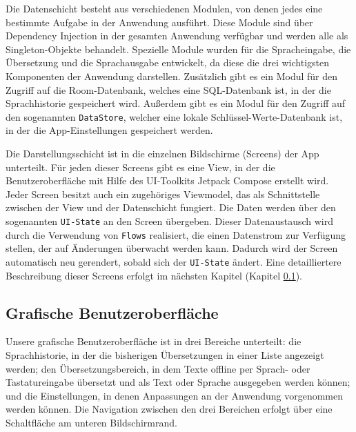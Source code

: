 Die Datenschicht besteht aus verschiedenen Modulen, von denen jedes eine bestimmte Aufgabe in der Anwendung ausführt. Diese Module sind über Dependency Injection in der gesamten Anwendung verfügbar und werden alle als Singleton-Objekte behandelt. Spezielle Module wurden für die Spracheingabe, die Übersetzung und die Sprachausgabe entwickelt, da diese die drei wichtigsten Komponenten der Anwendung darstellen. Zusätzlich gibt es ein Modul für den Zugriff auf die Room-Datenbank, welches eine SQL-Datenbank ist, in der die Sprachhistorie gespeichert wird. Außerdem gibt es ein Modul für den Zugriff auf den sogenannten \texttt{DataStore}, welcher eine lokale Schlüssel-Werte-Datenbank ist, in der die App-Einstellungen gespeichert werden. 

\bigbreak
\bigbreak

Die Darstellungsschicht ist in die einzelnen Bildschirme (Screens) der App unterteilt. Für jeden dieser Screens gibt es eine View, in der die Benutzeroberfläche mit Hilfe des UI-Toolkits Jetpack Compose erstellt wird. Jeder Screen besitzt auch ein zugehöriges Viewmodel, das als Schnittstelle zwischen der View und der Datenschicht fungiert. Die Daten werden über den sogenannten \texttt{UI-State} an den Screen übergeben. Dieser Datenaustausch wird durch die Verwendung von \texttt{Flows} realisiert, die einen Datenstrom zur Verfügung stellen, der auf Änderungen überwacht werden kann. Dadurch wird der Screen automatisch neu gerendert, sobald sich der \texttt{UI-State} ändert. Eine detailliertere Beschreibung dieser Screens erfolgt im nächsten Kapitel (Kapitel \ref{sec:implementation-ui}).

\subsection{Grafische Benutzeroberfläche}\label{sec:implementation-ui}
Unsere grafische Benutzeroberfläche ist in drei Bereiche unterteilt: die Sprachhistorie, in der die bisherigen Übersetzungen in einer Liste angezeigt werden; den Übersetzungsbereich, in dem Texte offline per Sprach- oder Tastatureingabe übersetzt und als Text oder Sprache ausgegeben werden können; und die Einstellungen, in denen Anpassungen an der Anwendung vorgenommen werden können. Die Navigation zwischen den drei Bereichen erfolgt über eine Schaltfläche am unteren Bildschirmrand.

